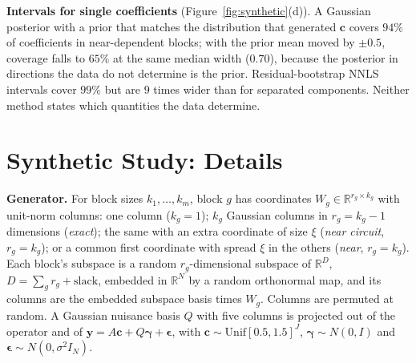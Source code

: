 \noindent\textbf{Intervals for single coefficients} (Figure~\ref{fig:synthetic}(d)).
A Gaussian posterior with a prior that matches the distribution that generated
\(\mathbf c\) covers \(94\%\) of coefficients in near-dependent blocks; with the prior
mean moved by \(\pm0.5\), coverage falls to \(65\%\) at the same median width
(\(0.70\)), because the posterior in directions the data do not determine is the
prior.  Residual-bootstrap NNLS intervals cover \(99\%\) but are \(9\) times wider than
for separated components.  Neither method states which quantities the data determine.

\section{Synthetic Study: Details}
\label{app:synthetic_details}

\noindent\textbf{Generator.}  For block sizes \(k_1,\dots,k_m\), block \(g\) has
coordinates \(W_g\in\mathbb R^{r_g\times k_g}\) with unit-norm columns: one column
(\(k_g=1\)); \(k_g\) Gaussian columns in \(r_g=k_g-1\) dimensions (\emph{exact}); the
same with an extra coordinate of size \(\xi\) (\emph{near circuit},
\(r_g=k_g\)); or a common first coordinate with spread \(\xi\) in the others
(\emph{near}, \(r_g=k_g\)).  Each block's subspace is a random \(r_g\)-dimensional
subspace of \(\mathbb R^D\), \(D=\sum_gr_g+\text{slack}\), embedded in \(\mathbb R^N\)
by a random orthonormal map, and its columns are the embedded subspace basis times
\(W_g\).  Columns are permuted at random.  A Gaussian nuisance basis \(Q\) with five
columns is projected out of the operator and of
\(\mathbf y=A\mathbf c+Q\boldsymbol\gamma+\boldsymbol\epsilon\), with
\(\mathbf c\sim\mathrm{Unif}[0.5,1.5]^J\), \(\boldsymbol\gamma\sim N(0,I)\) and
\(\boldsymbol\epsilon\sim N(0,\sigma^2I_N)\).


